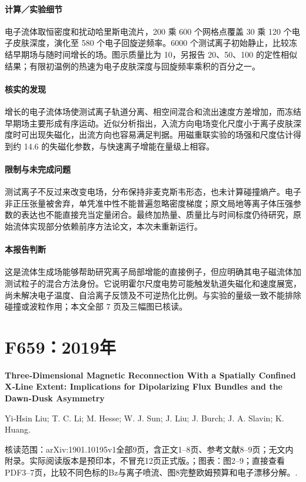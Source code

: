\documentclass[UTF8,a4paper,11pt,openany,fontset=fandol]{ctexbook}
\begin{document}
\paragraph{计算／实验细节}电子流体取恒密度和扰动哈里斯电流片，200 乘 600 个网格点覆盖 30 乘 120 个电子皮肤深度，演化至 580 个电子回旋逆频率。6000 个测试离子初始静止，比较冻结早期场与随时间增长的场。图示质量比为 10，另报告 20、50、100 的定性相似结果；有限初温例的热速为电子皮肤深度与回旋频率乘积的百分之一。

\paragraph{核实的发现}增长的电子流体场使测试离子轨道分离、相空间混合和流出速度方差增加，而冻结早期场主要形成有序运动。近似分析指出，入流方向电场变化尺度小于离子皮肤深度时可出现失磁化，出流方向也容易满足判据。用磁重联实验的场强和尺度估计得到约 14.6 的失磁化参数，与快速离子增能在量级上相容。

\paragraph{限制与未完成问题}测试离子不反过来改变电场，分布保持非麦克斯韦形态，也未计算碰撞熵产。电子非正压张量被舍弃，单凭准中性不能普遍忽略密度梯度；原文局地等离子体压强参数的表达也不能直接充当定量闭合。最终加热量、质量比与时间标度仍待研究，原始流体实现部分依赖前序方法论文，本次未重新运行。

\paragraph{本报告判断}这是流体生成场能够帮助研究离子局部增能的直接例子，但应明确其电子磁流体加测试粒子的混合方法身份。它说明霍尔尺度电势可能触发轨道失磁化和速度展宽，尚未解决电子温度、自洽离子反馈及不可逆热化比例。与实验的量级一致不能排除碰撞或波粒作用；本文全部 7 页及三幅图已核读。

\section{F659：2019年}\label{paper:F659}

\textbf{Three‐Dimensional Magnetic Reconnection With a Spatially Confined X‐Line Extent: Implications for Dipolarizing Flux Bundles and the Dawn‐Dusk Asymmetry}\citep{F659}\

Yi‐Hsin Liu;  T. C. Li;  M. Hesse;  W. J. Sun;  J. Liu;  J. Burch;  J. A. Slavin;  K. Huang.

\textsf{核读范围：}arXiv:1901.10195v1全部9页，含正文1–8页、参考文献8–9页；无文内附录。实际阅读版本是预印本，不冒充12页正式版。；\textsf{图表：}图2–9；直接查看PDF3–7页，比较不同色标的Bz与离子喷流、图8完整欧姆预算和电子漂移分解。.
\end{document}

